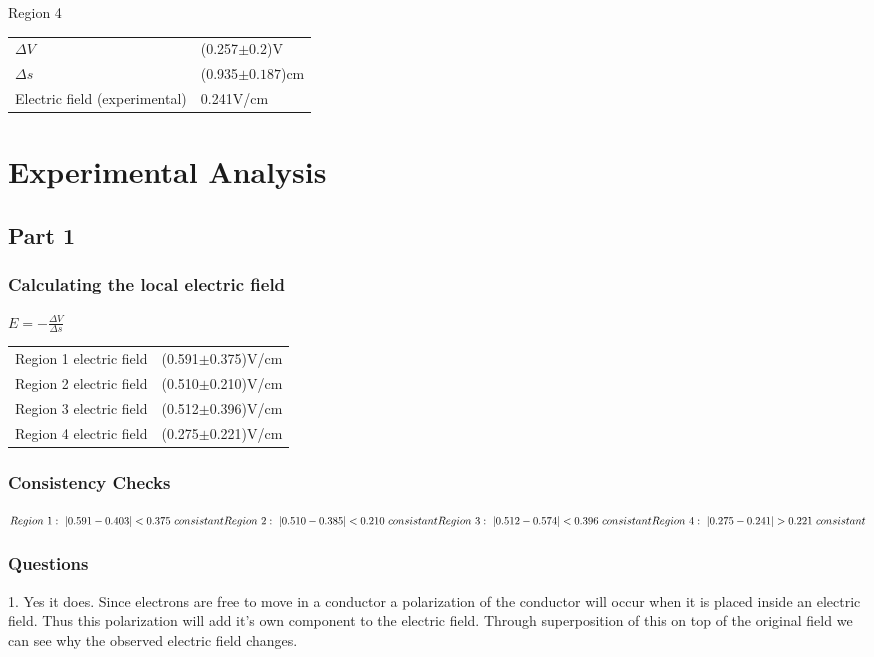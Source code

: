 \documentclass{article}
\begin{document}
Region 4\\
\begin{tabular}{ll}
$\Delta V$& (0.257$\pm0.2$)V\\
$\Delta s$ & (0.935$\pm0.187$)cm\\
Electric field (experimental) &0.241V/cm\\
\end{tabular}



\section{Experimental Analysis}
\subsection{Part 1}
\subsubsection{Calculating the local electric field}
$E=-\frac{\Delta V}{\Delta s}$\\

\begin{tabular}{ll}
Region 1 electric field&(0.591$\pm$0.375)V/cm\\
Region 2 electric field&(0.510$\pm$0.210)V/cm\\
Region 3 electric field&(0.512$\pm$0.396)V/cm\\
Region 4 electric field&(0.275$\pm$0.221)V/cm\\
\end{tabular}
\subsubsection{Consistency Checks}
$Region\ 1:\ |0.591-0.403| < 0.375\ consistant\\
Region\ 2:\ |0.510-0.385| < 0.210\ consistant\\
Region\ 3:\ |0.512-0.574| < 0.396\ consistant\\
Region\ 4:\ |0.275-0.241| > 0.221\ consistant
$
\subsubsection{Questions}
1. Yes it does. Since electrons are free to move in a conductor a polarization of the conductor will occur when it is placed inside an electric field. Thus this polarization will add it's own component to the electric field. Through superposition of this on top of the original field we can see why the observed electric field changes.\\
\end{document}
